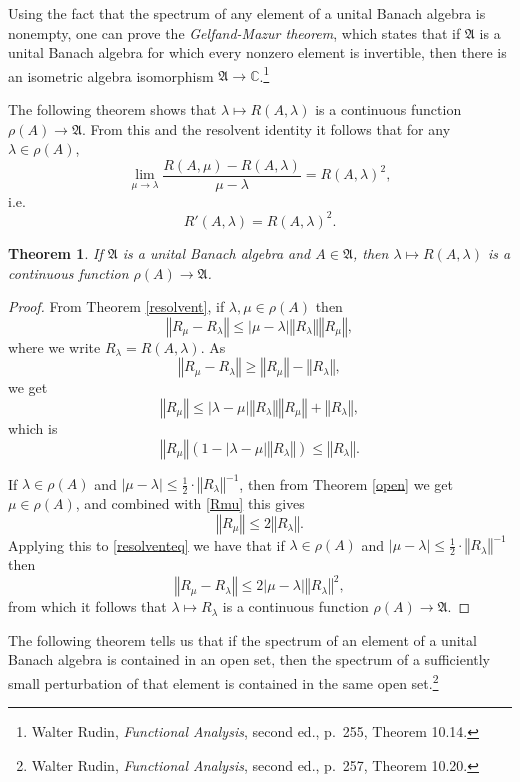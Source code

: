 \documentclass{article}
\newcommand{\norm}[1]{\left\Vert #1 \right\Vert}
\newtheorem{theorem}{Theorem}
\theoremstyle{definition}
\begin{document}
Using the fact that the spectrum of any element of a unital Banach algebra is nonempty, one can prove the
 {\em Gelfand-Mazur theorem}, which states that if $\mathfrak{A}$ is a unital Banach algebra for which every nonzero element is invertible, then there is an isometric
algebra isomorphism $\mathfrak{A} \to \mathbb{C}$.\footnote{Walter Rudin, {\em Functional Analysis}, second ed., p.~255, Theorem 10.14.}



The following theorem shows
that $\lambda \mapsto R(A,\lambda)$ is a continuous function $\rho(A) \to \mathfrak{A}$. From this and the resolvent identity it follows that
for any $\lambda \in \rho(A)$,
\[
\lim_{\mu \to \lambda} \frac{R(A,\mu)-R(A,\lambda)}{\mu-\lambda} = R(A,\lambda)^2,
\]
i.e.
\[
R'(A,\lambda)=R(A,\lambda)^2.
\]

\begin{theorem}
If $\mathfrak{A}$ is a unital Banach algebra and $A \in \mathfrak{A}$, then $\lambda \mapsto R(A,\lambda)$ is a continuous function
$\rho(A) \to \mathfrak{A}$.
\label{resolventcont}
\end{theorem}
\begin{proof}
From Theorem \ref{resolvent},
if $\lambda,\mu  \in \rho(A)$ then
\begin{equation}
\norm{R_\mu-R_\lambda} \leq |\mu-\lambda| \norm{R_\lambda} \norm{R_\mu},
\label{resolventeq}
\end{equation}
where we write $R_\lambda=R(A,\lambda)$.
As
\[
\norm{R_\mu-R_\lambda} \geq \norm{R_\mu}-\norm{R_\lambda},
\]
we get
\[
\norm{R_\mu} \leq |\lambda-\mu| \norm{R_\lambda} \norm{R_\mu} + \norm{R_\lambda},
\]
which is
\begin{equation}
\norm{R_\mu}(1-|\lambda-\mu| \norm{R_\lambda}) \leq \norm{R_\lambda}.
\label{Rmu}
\end{equation}

If $\lambda \in \rho(A)$ and 
$|\mu-\lambda| \leq \frac{1}{2}\cdot \norm{R_\lambda}^{-1}$, then
from Theorem \ref{open} we get $\mu \in \rho(A)$, and  combined with \eqref{Rmu} this gives 
\[
\norm{R_\mu} \leq 2 \norm{R_\lambda}.
\]
Applying this to \eqref{resolventeq} we have that if $\lambda \in \rho(A)$ and $|\mu-\lambda| \leq \frac{1}{2}\cdot \norm{R_\lambda}^{-1}$ then
\[
\norm{R_\mu-R_\lambda} \leq 2|\mu-\lambda| \norm{R_\lambda}^2,
\]
from which it follows that 
 $\lambda \mapsto R_\lambda$ is a continuous function $\rho(A) \to \mathfrak{A}$.
\end{proof}


The following theorem tells us that if the spectrum of an element of a unital Banach algebra is contained in an open set,
 then the spectrum of a sufficiently small perturbation of that element is contained in the same open set.\footnote{Walter Rudin, {\em Functional Analysis}, second ed., p.~257, Theorem 10.20.} 
 
\end{document}
